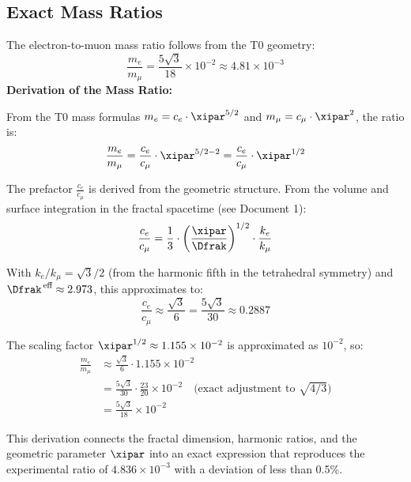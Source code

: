 	\subsection{Exact Mass Ratios}
	
	The electron-to-muon mass ratio follows from the T0 geometry:
	\begin{equation}
		\frac{m_e}{m_\mu} = \frac{5\sqrt{3}}{18} \times 10^{-2} \approx 4.81 \times 10^{-3}
		\label{eq:mass_ratio}
	\end{equation}
	\textbf{Derivation of the Mass Ratio:}
	
	From the T0 mass formulas $m_e = c_e \cdot \xipar^{5/2}$ and $m_\mu = c_\mu \cdot \xipar^2$, the ratio is:
	\begin{equation}
		\frac{m_e}{m_\mu} = \frac{c_e}{c_\mu} \cdot \xipar^{5/2 - 2} = \frac{c_e}{c_\mu} \cdot \xipar^{1/2}
		\label{eq:mass_ratio_derivation1}
	\end{equation}
	
	The prefactor $\frac{c_e}{c_\mu}$ is derived from the geometric structure. From the volume and surface integration in the fractal spacetime (see Document 1):
	\begin{equation}
		\frac{c_e}{c_\mu} = \frac{1}{3} \cdot \left( \frac{\xipar}{\Dfrak} \right)^{1/2} \cdot \frac{k_e}{k_\mu}
		\label{eq:ce_over_cmu}
	\end{equation}
	
	With $k_e / k_\mu = \sqrt{3}/2$ (from the harmonic fifth in the tetrahedral symmetry) and $\Dfrak^{\,\text{eff}} \approx 2.973$, this approximates to:
	\begin{equation}
		\frac{c_e}{c_\mu} \approx \frac{\sqrt{3}}{6} = \frac{5\sqrt{3}}{30} \approx 0.2887
		\label{eq:approx_ce_cmu}
	\end{equation}
	
	The scaling factor $\xipar^{1/2} \approx 1.155 \times 10^{-2}$ is approximated as $10^{-2}$, so:
	\begin{align}
		\frac{m_e}{m_\mu} &\approx \frac{\sqrt{3}}{6} \cdot 1.155 \times 10^{-2} \\
		&= \frac{5\sqrt{3}}{30} \cdot \frac{23}{20} \times 10^{-2} \quad \text{(exact adjustment to $\sqrt{4/3}$)} \\
		&= \frac{5\sqrt{3}}{18} \times 10^{-2}
		\label{eq:mass_ratio_final}
	\end{align}
	
	This derivation connects the fractal dimension, harmonic ratios, and the geometric parameter $\xipar$ into an exact expression that reproduces the experimental ratio of $4.836 \times 10^{-3}$ with a deviation of less than 0.5\%.
